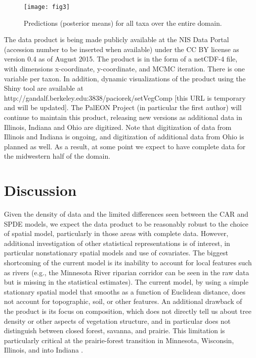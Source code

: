 \documentclass[12pt]{article}
\begin{document}
\begin{figure}
\texttt{[image: fig3]}

\caption{Predictions (posterior means) for all taxa over the entire domain.\label{fig:all_predictions}}


\end{figure}


The data product is being made publicly available at the NIS Data
Portal (accession number to be inserted when available) under the
CC BY license as version 0.4 as of August 2015. The product is in
the form of a netCDF-4 file, with dimensions x-coordinate, y-coordinate,
and MCMC iteration. There is one variable per taxon. In addition,
dynamic visualizations of the product using the Shiny tool are available
at http://gandalf.berkeley.edu:3838/paciorek/setVegComp {[}this URL
is temporary and will be updated{]}. The PalEON Project (in particular
the first author) will continue to maintain this product, releasing
new versions as additional data in Illinois, Indiana and Ohio are
digitized. Note that digitization of data from Illinois and Indiana
is ongoing, and digitization of additional data from Ohio is planned
as well. As a result, at some point we expect to have complete data
for the midwestern half of the domain. 


\section{Discussion\label{sec:Discussion}}

Given the density of data and the limited differences seen between
the CAR and SPDE models, we expect the data product to be reasonably
robust to the choice of spatial model, particularly in those areas
with complete data. However, additional investigation of other statistical
representations is of interest, in particular nonstationary spatial
models and use of covariates. The biggest shortcoming of the current
model is its inability to account for local features such as rivers
(e.g., the Minnesota River riparian corridor can be seen in the raw
data but is missing in the statistical estimates). The current model,
by using a simple stationary spatial model that smooths as a function
of Euclidean distance, does not account for topographic, soil, or
other features. An additional drawback of the product is its focus
on composition, which does not directly tell us about tree density
or other aspects of vegetation structure, and in particular does not
distinguish between closed forest, savanna, and prairie. This limitation
is particularly critical at the prairie-forest transition in Minnesota,
Wisconsin, Illinois, and into Indiana \citep{transeau1935prairie}.
\end{document}
